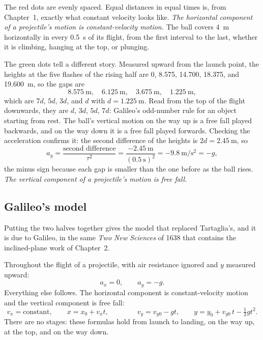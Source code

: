 \documentclass[11pt,twoside,openany]{book}
\begin{document}
The red dots are evenly spaced. Equal distances in equal times is, from Chapter~1, exactly what constant velocity looks like. \emph{The horizontal component of a projectile's motion is constant-velocity motion.} The ball covers \SI{4}{\metre} horizontally in every \SI{0.5}{\second} of its flight, from the first interval to the last, whether it is climbing, hanging at the top, or plunging.

The green dots tell a different story. Measured upward from the launch point, the heights at the five flashes of the rising half are \SI{0}{}, \SI{8.575}{}, \SI{14.700}{}, \SI{18.375}{}, and \SI{19.600}{\metre}, so the gaps are
\[
\SI{8.575}{\metre},\quad \SI{6.125}{\metre},\quad \SI{3.675}{\metre},\quad \SI{1.225}{\metre},
\]
which are $7d$, $5d$, $3d$, and $d$ with $d = \SI{1.225}{\metre}$. Read from the top of the flight downwards, they are $d$, $3d$, $5d$, $7d$: Galileo's odd-number rule for an object starting from rest. The ball's vertical motion on the way up is a free fall played backwards, and on the way down it is a free fall played forwards. Checking the acceleration confirms it: the second difference of the heights is $2d = \SI{2.45}{\metre}$, so
\[
a_y = \frac{\text{second difference}}{\tau^2} = \frac{\SI{-2.45}{\metre}}{(\SI{0.5}{\second})^2} = \SI{-9.8}{\metre\per\second\squared} = -g,
\]
the minus sign because each gap is smaller than the one before as the ball rises. \emph{The vertical component of a projectile's motion is free fall.}

\subsection{Galileo's model}

Putting the two halves together gives the model that replaced Tartaglia's, and it is due to Galileo, in the same \emph{Two New Sciences} of 1638 that contains the inclined-plane work of Chapter~2.

\begin{keyidea}
Throughout the flight of a projectile, with air resistance ignored and $y$ measured upward:
\[
a_x = 0, \qquad a_y = -g.
\]
Everything else follows. The horizontal component is constant-velocity motion and the vertical component is free fall:
\[
v_x = \text{constant}, \qquad x = x_0 + v_x t, \qquad\qquad
v_y = v_{y0} - g t, \qquad y = y_0 + v_{y0}\,t - \tfrac12 g t^2 .
\]
There are no stages: these formulas hold from launch to landing, on the way up, at the top, and on the way down.
\end{keyidea}
\end{document}
